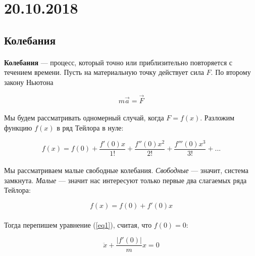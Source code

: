 \documentclass[dvipdfmx]{article}
\begin{document}
\newpage
\noindent\makebox[\linewidth]{\rule{\paperwidth}{0.4pt}}
\section{20.10.2018}
\noindent\makebox[\linewidth]{\rule{\paperwidth}{0.4pt}}

\subsection{Колебания}

\paragraph{}

\textbf{Колебания} --- процесс, который точно или приблизительно повторяется с течением времени.
Пусть на материальную точку действует сила $F$. По второму закону Ньютона

\begin{equation}\label{eq1}
  m\vec{a} = \vec{F}
\end{equation}

\paragraph{}
Мы будем рассматривать одномерный случай, когда $F = f(x)$. Разложим функцию $f(x)$ в ряд Тейлора в нуле:

\begin{equation*}
  f(x) = f(0) + \frac{f'(0)x}{1!} + \frac{f''(0)x^2}{2!} + \frac{f'''(0)x^3}{3!} + ...
\end{equation*}

\paragraph{}
Мы рассматриваем малые свободные колебания.
\textit{Свободные} --- значит, система замкнута.
\textit{Малые} --- значит нас интересуют
только первые два слагаемых ряда Тейлора:

\begin{equation*}
  f(x) = f(0) + f'(0)x
\end{equation*}

\paragraph{}
Тогда перепишем уравнение (\ref{eq1}), считая, что $f(0) = 0$:

\begin{equation*}
  \ddot{x} + \frac{|f'(0)|}{m}x = 0
\end{equation*}
\end{document}
